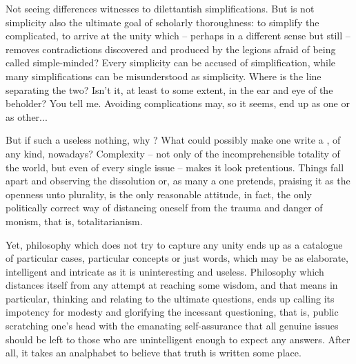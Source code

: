
Not seeing differences witnesses to dilettantish simplifications. But is not
simplicity also the ultimate goal of scholarly thoroughness: to simplify the complicated,
to arrive at the unity which -- perhaps in a different sense but still --
removes contradictions discovered and produced by the
legions afraid of being called simple-minded? Every simplicity can be
accused of simplification, while many simplifications can be misunderstood as
simplicity. Where is the line separating the two? Isn't it, at least to some
extent, in the ear and eye of the beholder? You tell me. Avoiding complications
may, so it seems, end up as one or as other...



%
But if such a useless nothing, why ? 
What could possibly make one write a , of any kind, nowadays?
Complexity -- not only of the incomprehensible totality of the world, but even
of every single issue -- makes it look pretentious. Things fall apart
and observing the dissolution or, as many a one pretends, praising it as the
openness unto plurality, is the only reasonable attitude, in fact, the only
politically correct way of distancing oneself from the trauma and danger of monism,
that is, totalitarianism.

Yet, philosophy which does not try to capture any unity ends up as a catalogue
of particular cases, particular concepts or just words, which may be as
elaborate, intelligent and intricate as it is uninteresting and useless.
Philosophy which distances itself from any attempt at reaching some wisdom, and
that means in particular, thinking and relating to the ultimate questions, 
ends up calling its impotency for modesty and glorifying the incessant
questioning, that is, public scratching one's head with the emanating
self-assurance that all genuine issues should be left to those who are
unintelligent enough to expect any answers. After all, it takes an analphabet to
believe that truth is written some place.
%

